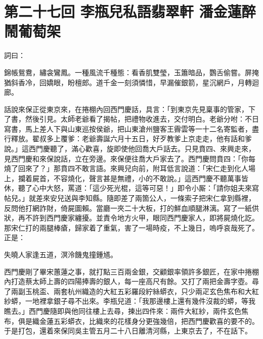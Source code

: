 
\chapter*{第二十七回 李瓶兒私語翡翠軒 潘金蓮醉鬧葡萄架}


詞曰：

\begin{myquote}
錦帳鴛鴦，繡衾鸞鳳。一種風流千種態：看香肌雙瑩，玉簫暗品，鸚舌偷嘗。屏掩猶斜香冷，回嬌眼，盼檀郎。道千金一刻須憐惜，早漏催銀箭，星沉網戶，月轉迴廊。

\end{myquote}

話說來保正從東京來，在捲棚內回西門慶話，具言：「到東京先見稟事的管家，下了書，然後引見。太師老爺看了揭帖，把禮物收進去，交付明白。老爺分咐：不日寫書，馬上差人下與山東巡按侯爺，把山東滄州鹽客王霽雲等一十二名寄監者，盡行釋放。翟叔多上覆爹：老爺壽誕六月十五日，好歹教爹上京走走，他有話和爹說。」這西門慶聽了，滿心歡喜，旋即使他回喬大戶話去。只見賁四、來興走來，見西門慶和來保說話，立在旁邊。來保便往喬大戶家去了。西門慶問賁四：「你每燒了回來了？」那賁四不敢言語。來興兒向前，附耳低言說道：「宋仁走到化人場上，攔着屍首，不容燒化，聲言甚是無禮，小的不敢說。」這西門慶不聽萬事皆休，聽了心中大怒，罵道：「這少死光棍，這等可惡！」即令小厮：「請你姐夫來寫帖兒。」就差來安兒送與李知縣。隨即差了兩箇公人，一條索子把宋仁拿到縣裡，反問他打網詐財，倚屍圖賴。{}當廳一夾二十大板，打的鮮血順腿淋漓。寫了一紙供狀，再不許到西門慶家纏擾。並責令地方火甲，眼同西門慶家人，即將屍燒化訖。那宋仁打的兩腿棒瘡，歸家着了重氣，害了一場時疫，不上幾日，嗚呼哀哉死了。正是：

\begin{myquote}
失曉人家逢五道，溟泠饑鬼撞鍾馗。
\end{myquote}

西門慶剛了畢宋蕙蓮之事，就打點三百兩金銀，交顧銀率領許多銀匠，在家中捲棚內打造蔡太師上壽的四陽捧壽的銀人，每一座高尺有餘。又打了兩把金壽字壺。尋了兩副玉桃盃、兩套杭州織造的大紅五彩羅段紵絲蟒衣，只少兩疋玄色焦布和大紅紗蟒，一地裡拿銀子尋不出來。李瓶兒道：「我那邊樓上還有幾件沒裁的蟒，等我瞧去。」{}西門慶隨即與他同往樓上去尋，揀出四件來：兩件大紅紗，兩件玄色焦布，俱是織金蓮五彩蟒衣，比織來的花樣身分更強幾倍，把西門慶歡喜的要不的。于是打包，還着來保同吳主管五月二十八日離清河縣，上東京去了，不在話下。

